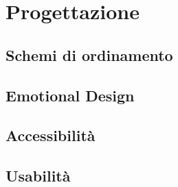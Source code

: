 \section{Progettazione}
    \subsection{Schemi di ordinamento}
    \subsection{Emotional Design}
    \subsection{Accessibilità}
    \subsection{Usabilità}

